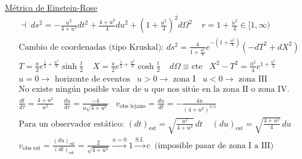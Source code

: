 \underline{Métrica de Einstein-Rose}
\begin{align*}
    &\dashv\;  ds^2=-\frac{u^2}{4+u^2}dt^2 + \frac{4+u^2}{4}du^2 + \left(1+\frac{u^2}{4}\right)^2 d\Omega^2\; \; \;\; r=1+\frac{u^2}{4} \in[1,\infty)\\
    &\text{Cambio de coordenadas (tipo Kruskal): }ds^2=\frac{4}{1+\frac{u^2}{4}}e^{-(1+\frac{u^2}{4})}(-dT^2+dX^2)\\
    &T=\frac{u}{2}e^{\frac{1}{2}+\frac{u^2}{8}}\sinh\frac{t}{2}\; \; \; \; X=\frac{u}{2}e^{\frac{1}{2}+\frac{u^2}{8}}\cosh\frac{t}{2}\; \; \; \; d\Omega\equiv \text{cte}\; \; \;  X^2-T^2=\frac{u^2}{4}e^{1+\frac{u^2}{4}}\\
    &\text{$u=0\rightarrow $ horizonte de eventos}\; \; \; u>0\rightarrow\text{ zona I}\; \;\; u<0 \rightarrow\text{ zona III}\\
    &\text{No existe ningún posible valor de $u$ que nos sitúe en la zona II o zona IV.}\\
    &\frac{dt}{d\tau}=\frac{4+u^2}{u^2} \; \; \; \; \frac{du}{d\tau}=\frac{-4}{u\sqrt{4+u^2}}\; \; \; v_{\text{obs lejano}}=\frac{du}{dt}=-\frac{4u}{(4+u^2)^{3/2}}\\
    &\text{Para un observador estático: } (dt)_{\text{est}} =\sqrt{\frac{u^2}{4+u^2}} \, dt\;\; \; \; (du)_{\text{est}}=\sqrt{\frac{4+u^2}{4}}\, du\\
    &v_{\text{obs est}}=\frac{(du)_{\text{est}}}{(dt)_{\text{est}}} = \frac{2}{\sqrt{4+u^2}}\xrightarrow{u=0} 1\xrightarrow{\text{S.I.}}c \; \; (\text{imposible pasar de zona I a III)}
    \end{align*}